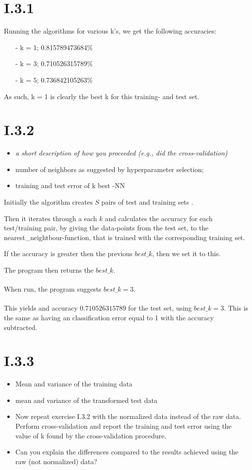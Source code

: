 \documentclass[12pt, a4paper]{article}
\begin{document}
\section{I.3.1}

Running the algorithms for various k's, we get the following accuracies:

\begin{itemize}
\item[-] k = 1; 0.815789473684\%
\item[-] k = 3; 0.710526315789\% 
\item[-] k = 5; 0.736842105263\%
\end{itemize}

As such, k = 1 is clearly the best k for this training- and test set.

\section{I.3.2}
\begin{itemize}
\item \textit{a short description of how you proceeded (e.g., did the
cross-validation)}
\item number of neighbors as suggested by hyperparameter selection;
\item training and test error of k best -NN
\end{itemize}

Initially the algorithm creates $S$ pairs of test and training sets .

Then it iterates through a each $k$ and calculates the accuracy for each test/training pair, by giving the data-points from the test set, to the nearest\_neightbour-function, that is trained with the corresponding training set.

If the accuracy is greater then the previous $best\_k$, then we set it to this.

The program then returns the $best\_k$.\\\\
When run, the program suggests $best\_k = 3$.\\\\
This yields and accuracy $0.710526315789$ for the test set, using $best\_k = 3$. This is the same as having an classification error equal to 1 with the accuracy subtracted.


\section{I.3.3}
\begin{itemize}
\item Mean and variance of the training data
\item mean and variance of the transformed test data
\item Now repeat exercise I.3.2 with the normalized data instead of the raw data.
Perform cross-validation and report the training and test error using the value
of k found by the cross-validation procedure.
\item Can you explain the differences
compared to the results achieved using the raw (not normalized) data?
\end{itemize}
\end{document}
